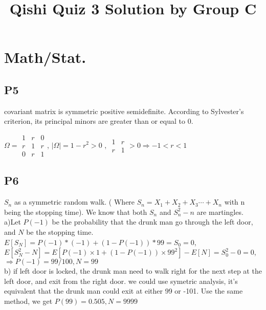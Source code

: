 \documentclass[10pt]{article}
\begin{document}
  

\title{ Qishi Quiz 3 Solution by Group C }
\date{}
\maketitle

\section{Math/Stat.}


\subsection*{P5}
covariant matrix is symmetric positive semidefinite. According to Sylvester's criterion, its principal minors are greater than or equal to 0.

$ \Omega=\begin{array}{|ccc|}1 & r & 0 \\
r & 1 & r \\
0 & r & 1\end{array} $, $\left|\Omega\right| = 1-r^2 > 0$ , $\begin{array}{|cc|} 1 & r \\ r & 1\end{array} > 0 \Longrightarrow -1 < r < 1 $ 
  
\subsection*{P6}
$S_n$ as a symmetric random walk. 
( Where $S_n = X_1 + X_2 + X_3 \cdots + X_n $ with n being the stopping time). We know that both $S_n$ and $S^2_n - n $ are martingles. \\
\quad  a)Let $P(-1)$ be the probability that the drunk man go through the left door, and $N $ be the stopping time.
$E[S_N] = P(-1)*(-1) + (1-P(-1))*99 = S_0 = 0 $,
$E[S_N^2-N] = E[ P(-1)\times 1 + (1-P(-1))\times 99^2] - E[N] = S_0^2 - 0 = 0$, $\Longrightarrow P(-1) = 99/100, N=99$\\
\quad  b) if left door is locked, the drunk man need to walk right for the next step at the left door, and exit from the right door.  we could use symetric analysis, it's equivalent that the drunk man could exit at either 99 or -101.
Use the same method, we get  $P(99) = 0.505, N= 9999$
\end{document}

